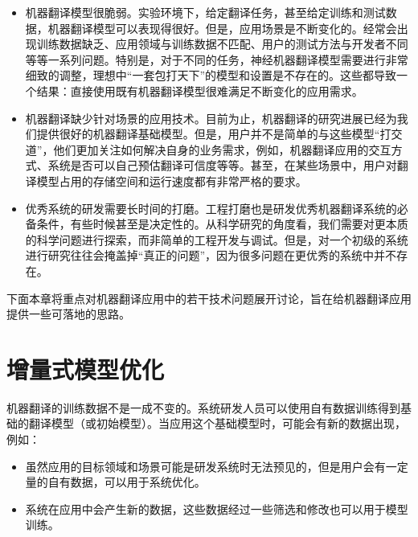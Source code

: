 \begin{itemize}
\vspace{0.5em}
\item 机器翻译模型很脆弱。实验环境下，给定翻译任务，甚至给定训练和测试数据，机器翻译模型可以表现得很好。但是，应用场景是不断变化的。经常会出现训练数据缺乏、应用领域与训练数据不匹配、用户的测试方法与开发者不同等等一系列问题。特别是，对于不同的任务，神经机器翻译模型需要进行非常细致的调整，理想中“一套包打天下”的模型和设置是不存在的。这些都导致一个结果：直接使用既有机器翻译模型很难满足不断变化的应用需求。

\vspace{0.5em}
\item 机器翻译缺少针对场景的应用技术。目前为止，机器翻译的研究进展已经为我们提供很好的机器翻译基础模型。但是，用户并不是简单的与这些模型“打交道”，他们更加关注如何解决自身的业务需求，例如，机器翻译应用的交互方式、系统是否可以自己预估翻译可信度等等。甚至，在某些场景中，用户对翻译模型占用的存储空间和运行速度都有非常严格的要求。

\vspace{0.5em}
\item 优秀系统的研发需要长时间的打磨。工程打磨也是研发优秀机器翻译系统的必备条件，有些时候甚至是决定性的。从科学研究的角度看，我们需要对更本质的科学问题进行探索，而非简单的工程开发与调试。但是，对一个初级的系统进行研究往往会掩盖掉“真正的问题”，因为很多问题在更优秀的系统中并不存在。
\vspace{0.5em}
\end{itemize}

\parinterval 下面本章将重点对机器翻译应用中的若干技术问题展开讨论，旨在给机器翻译应用提供一些可落地的思路。


\section{增量式模型优化}

\parinterval 机器翻译的训练数据不是一成不变的。系统研发人员可以使用自有数据训练得到基础的翻译模型（或初始模型）。当应用这个基础模型时，可能会有新的数据出现，例如：

\begin{itemize}
\vspace{0.5em}
\item 虽然应用的目标领域和场景可能是研发系统时无法预见的，但是用户会有一定量的自有数据，可以用于系统优化。
\vspace{0.5em}
\item 系统在应用中会产生新的数据，这些数据经过一些筛选和修改也可以用于模型训练。
\vspace{0.5em}
\end{itemize}

